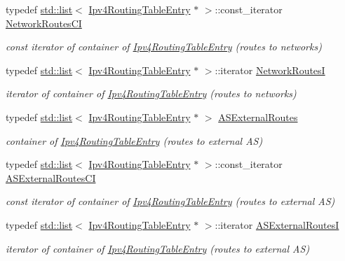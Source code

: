 \begin{DoxyCompactItemize}
typedef \hyperlink{openflow-interface_8h_afd9bcfa176617760671b67580f536fa7}{std\+::list}$<$ \hyperlink{classns3_1_1Ipv4RoutingTableEntry}{Ipv4\+Routing\+Table\+Entry} $\ast$ $>$\+::const\+\_\+iterator \hyperlink{classns3_1_1Ipv4GlobalRouting_a951edfd8275e2329a7fd4c5f00ac420e}{Network\+Routes\+CI}
\begin{DoxyCompactList}\small\item\em const iterator of container of \hyperlink{classns3_1_1Ipv4RoutingTableEntry}{Ipv4\+Routing\+Table\+Entry} (routes to networks) \end{DoxyCompactList}\item 
typedef \hyperlink{openflow-interface_8h_afd9bcfa176617760671b67580f536fa7}{std\+::list}$<$ \hyperlink{classns3_1_1Ipv4RoutingTableEntry}{Ipv4\+Routing\+Table\+Entry} $\ast$ $>$\+::iterator \hyperlink{classns3_1_1Ipv4GlobalRouting_a52c6db3cff38f2600555615bb9840ca5}{Network\+RoutesI}
\begin{DoxyCompactList}\small\item\em iterator of container of \hyperlink{classns3_1_1Ipv4RoutingTableEntry}{Ipv4\+Routing\+Table\+Entry} (routes to networks) \end{DoxyCompactList}\item 
typedef \hyperlink{openflow-interface_8h_afd9bcfa176617760671b67580f536fa7}{std\+::list}$<$ \hyperlink{classns3_1_1Ipv4RoutingTableEntry}{Ipv4\+Routing\+Table\+Entry} $\ast$ $>$ \hyperlink{classns3_1_1Ipv4GlobalRouting_a1227a5732cb954fe1a2255b7799ba296}{A\+S\+External\+Routes}
\begin{DoxyCompactList}\small\item\em container of \hyperlink{classns3_1_1Ipv4RoutingTableEntry}{Ipv4\+Routing\+Table\+Entry} (routes to external AS) \end{DoxyCompactList}\item 
typedef \hyperlink{openflow-interface_8h_afd9bcfa176617760671b67580f536fa7}{std\+::list}$<$ \hyperlink{classns3_1_1Ipv4RoutingTableEntry}{Ipv4\+Routing\+Table\+Entry} $\ast$ $>$\+::const\+\_\+iterator \hyperlink{classns3_1_1Ipv4GlobalRouting_aabafd3cfb22a4cc8f84b166a97b88c57}{A\+S\+External\+Routes\+CI}
\begin{DoxyCompactList}\small\item\em const iterator of container of \hyperlink{classns3_1_1Ipv4RoutingTableEntry}{Ipv4\+Routing\+Table\+Entry} (routes to external AS) \end{DoxyCompactList}\item 
typedef \hyperlink{openflow-interface_8h_afd9bcfa176617760671b67580f536fa7}{std\+::list}$<$ \hyperlink{classns3_1_1Ipv4RoutingTableEntry}{Ipv4\+Routing\+Table\+Entry} $\ast$ $>$\+::iterator \hyperlink{classns3_1_1Ipv4GlobalRouting_a2f2e1f2c8d631cfd016343f993cf577b}{A\+S\+External\+RoutesI}
\begin{DoxyCompactList}\small\item\em iterator of container of \hyperlink{classns3_1_1Ipv4RoutingTableEntry}{Ipv4\+Routing\+Table\+Entry} (routes to external AS) \end{DoxyCompactList}\end{DoxyCompactItemize}
